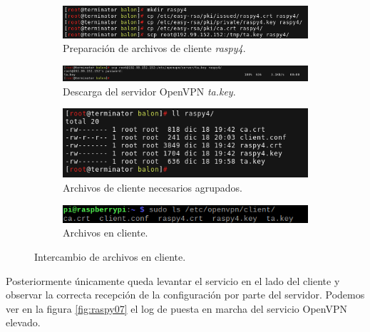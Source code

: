 \documentclass[a4paper, 11pt, titlepage]{article}
\begin{document}
        \begin{figure}[htp]
        \centering
            \begin{subfigure}[b]{0.8\linewidth}
            \includegraphics[width=1\textwidth]{resources/raspy03.png}
            \caption{Preparación de archivos de cliente \textit{raspy4}.}
            \end{subfigure}

            \begin{subfigure}[b]{1\linewidth}
            \includegraphics[width=1\textwidth]{resources/raspy04.png}
            \caption{Descarga del servidor OpenVPN \textit{ta.key}.}
            \end{subfigure}
                
            \begin{subfigure}[b]{0.6\linewidth}
            \includegraphics[width=1\textwidth]{resources/raspy05.png}
            \caption{Archivos de cliente necesarios agrupados.}
            \end{subfigure}

            \begin{subfigure}[b]{0.6\linewidth}
            \includegraphics[width=1\textwidth]{resources/raspy06.png}
            \caption{Archivos en cliente.}
            \end{subfigure}
        \caption{Intercambio de archivos en cliente.}
        \label{fig:raspy0306}
        \end{figure}

        Posteriormente únicamente queda levantar el servicio en el lado del cliente y observar la
        correcta recepción de la configuración por parte del servidor. Podemos ver en la figura 
        \ref{fig:raspy07} el log de puesta en marcha del servicio OpenVPN elevado.
\end{document}
